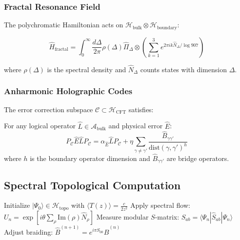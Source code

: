 \documentclass[12pt]{article}
\begin{document}
\subsubsection{Fractal Resonance Field}
The polychromatic Hamiltonian acts on $\mathcal{H}_{\text{bulk}}\otimes\mathcal{H}_{\text{boundary}}$:

\begin{equation}
\hat{H}_{\text{fractal}} = \int_0^\infty \frac{d\Delta}{2\pi} \rho(\Delta)\hat{\Pi}_\Delta \otimes \left(\sum_{k=1}^3 e^{2\pi ik\hat{N}_\Delta/\log 907}\right)
\end{equation}

where $\rho(\Delta)$ is the spectral density and $\hat{N}_\Delta$ counts states with dimension $\Delta$.

\subsubsection{Anharmonic Holographic Codes}
The error correction subspace $\mathcal{C}\subset\mathcal{H}_{\text{CFT}}$ satisfies:

\begin{theorem}
For any logical operator $\hat{L}\in\mathcal{A}_{\text{bulk}}$ and physical error $\hat{E}$:
\begin{equation}
P_{\mathcal{C}}\hat{E}\hat{L}P_{\mathcal{C}} = \alpha_{\hat{E}} \hat{L}P_{\mathcal{C}} + \eta\sum_{\gamma\neq\gamma'}\frac{\hat{B}_{\gamma\gamma'}}{\text{dist}(\gamma,\gamma')^{h}}
\end{equation}
where $h$ is the boundary operator dimension and $\hat{B}_{\gamma\gamma'}$ are bridge operators.
\end{theorem}

\subsection{Spectral Topological Computation}

\begin{algorithm}[H]
\caption{Spectral Turing-Amplitude Evolution}
\begin{algorithmic}[1]
\STATE Initialize $|\Psi_0\rangle \in \mathcal{H}_{\text{topo}}$ with $\langle T(z)\rangle = \frac{c}{2z^2}$
\STATE Apply spectral flow: $U_n = \exp\left[i\theta\sum_{\rho}\text{Im}(\rho)\hat{N}_\rho\right]$
\STATE Measure modular $S$-matrix: $S_{ab} = \langle \Psi_n|\hat{S}_{ab}|\Psi_n\rangle$
\STATE Adjust braiding: $\hat{B}^{(n+1)} = e^{i\pi S_{00}}\hat{B}^{(n)}$
\ENDFOR
\end{algorithmic}
\end{algorithm}
\end{document}
